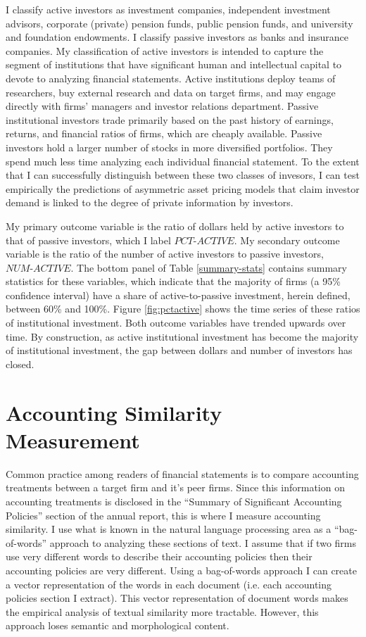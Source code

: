 \documentclass[thesis]{thesis-umich}
\begin{document}
I classify active investors as investment companies, independent investment advisors, corporate (private) pension funds, public pension funds, and university and foundation endowments. I classify passive investors as banks and insurance companies. My classification of active investors is intended to capture the segment of institutions that have significant human and intellectual capital to devote to analyzing financial statements. Active institutions deploy teams of researchers, buy external research and data on target firms, and may engage directly with firms' managers and investor relations department. Passive institutional investors trade primarily based on the past history of earnings, returns, and financial ratios of firms, which are cheaply available. Passive investors hold a larger number of stocks in more diversified portfolios. They spend much less time analyzing each individual financial statement. To the extent that I can successfully distinguish between these two classes of invesors, I can test empirically the predictions of asymmetric asset pricing models that claim investor demand is linked to the degree of private information by investors.

My primary outcome variable is the ratio of dollars held by active investors to that of passive investors, which I label $PCT\text{-}ACTIVE$. My secondary outcome variable is the ratio of the number of active investors to passive investors, $NUM\text{-}ACTIVE$. The bottom panel of Table \ref{summary-stats} contains summary statistics for these variables, which indicate that the majority of firms (a 95\% confidence interval) have a share of active-to-passive investment, herein defined, between 60\% and 100\%.
Figure \ref{fig:pctactive} shows the time series of these ratios of institutional investment. Both outcome variables have trended upwards over time. By construction, as active institutional investment has become the majority of institutional investment, the gap between dollars and number of investors has closed.

\section{Accounting Similarity Measurement}\label{sec:sim}
Common practice among readers of financial statements is to compare accounting treatments between a target firm and it's peer firms. Since this information on accounting treatments is disclosed in the ``Summary of Significant Accounting Policies'' section of the annual report, this is where I measure accounting similarity. I use what is known in the natural language processing area as a ``bag-of-words'' approach to analyzing these sections of text. I assume that if two firms use very different words to describe their accounting policies then their accounting policies are very different. Using a bag-of-words approach I can create a vector representation of the words in each document (i.e. each accounting policies section I extract). This vector representation of document words makes the empirical analysis of textual similarity more tractable. However, this approach loses semantic and morphological content.
\end{document}
